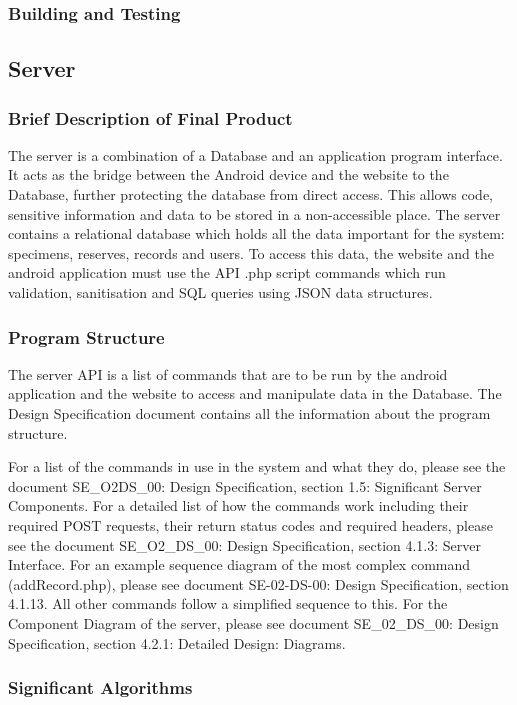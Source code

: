     \subsubsection{Building and Testing}

\subsection{Server}
    \subsubsection{Brief Description of Final Product}
        The server is a combination of a Database and an application program interface. It acts as the bridge between the Android device and the website to the Database, further protecting the database from direct access. This allows code, sensitive information and data to be stored in a non-accessible place. The server contains a relational database which holds all the data important for the system: specimens, reserves, records and users. To access this data, the website and the android application must use the API .php script commands which run validation, sanitisation and SQL queries using JSON data structures. 

    \subsubsection{Program Structure}
        The server API is a list of commands that are to be run by the android application and the website to access and manipulate data in the Database. The Design Specification document contains all the information about the program structure.

        For a list of the commands in use in the system and what they do, please see the document SE\_O2\-DS\_00: Design Specification, section 1.5: Significant Server Components. For a detailed list of how the commands work including their required POST requests, their return status codes and required headers, please see the document SE\_O2\_DS\_00: Design Specification, section 4.1.3: Server Interface. For an example sequence diagram of the most complex command (addRecord.php), please see document SE-02-DS-00: Design Specification, section 4.1.13. All other commands follow a simplified sequence to this. For the Component Diagram of the server, please see document SE\_02\_DS\_00: Design Specification, section 4.2.1: Detailed Design: Diagrams. 

    \subsubsection{Significant Algorithms}

